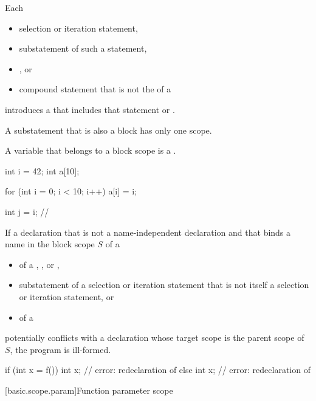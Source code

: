 \pnum
Each
\begin{itemize}
\item
selection or iteration statement,
\item
substatement of such a statement,
\item
{}%
, or
\item
compound statement
that is not the  of a 
\end{itemize}
introduces a 
that includes that statement or .
\begin{note}
A substatement that is also a block has only one scope.
\end{note}
A variable that belongs to a block scope is a .
\begin{example}
\begin{codeblock}
int i = 42;
int a[10];

for (int i = 0; i < 10; i++)
  a[i] = i;

int j = i;          // 
\end{codeblock}
\end{example}

\pnum
If a declaration
that is not a name-independent declaration and
that binds a name in the block scope $S$ of a
\begin{itemize}
\item
{} of a ,
, or ,
\item
substatement of a selection or iteration statement
that is not itself a selection or iteration statement, or
\item
{} of a 
\end{itemize}
potentially conflicts with a declaration
whose target scope is the parent scope of $S$,
the program is ill-formed.
\begin{example}
\begin{codeblock}
if (int x = f()) {
  int x;            // error: redeclaration of 
}
else {
  int x;            // error: redeclaration of 
}
\end{codeblock}
\end{example}

[basic.scope.param]{Function parameter scope}

